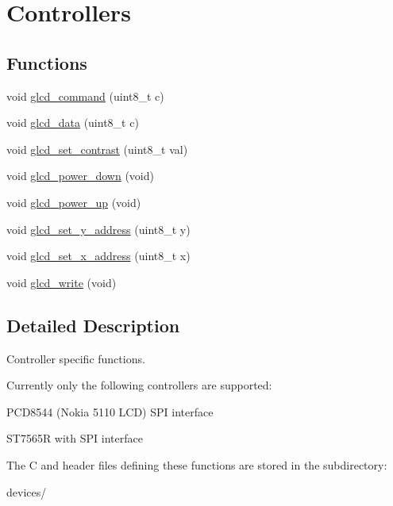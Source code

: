 \hypertarget{group___controllers}{}\section{Controllers}
\label{group___controllers}
\subsection*{Functions}
\begin{DoxyCompactItemize}
\item 
void \hyperlink{group___controllers_ga5b72b58ca45f76a55d3c3f38efc87eb8}{glcd\+\_\+command} (uint8\+\_\+t c)
\item 
void \hyperlink{group___controllers_gaba6b8ce5d4afaec0071f05f9c3510db6}{glcd\+\_\+data} (uint8\+\_\+t c)
\item 
void \hyperlink{group___controllers_gac206e5a35afe3ca28bb2ba3101484da8}{glcd\+\_\+set\+\_\+contrast} (uint8\+\_\+t val)
\item 
void \hyperlink{group___controllers_ga1a8994c3da4518c34e240971a37bfe9d}{glcd\+\_\+power\+\_\+down} (void)
\item 
void \hyperlink{group___controllers_ga496be0117727a0a2b86054932d85c209}{glcd\+\_\+power\+\_\+up} (void)
\item 
void \hyperlink{group___controllers_ga36434245ca7c131a775d7a6ba0cf587b}{glcd\+\_\+set\+\_\+y\+\_\+address} (uint8\+\_\+t y)
\item 
void \hyperlink{group___controllers_ga1fbdc5e57b13611a632dee191a56d772}{glcd\+\_\+set\+\_\+x\+\_\+address} (uint8\+\_\+t x)
\item 
void \hyperlink{group___controllers_ga0df6c0642fff31b764298958eda56efb}{glcd\+\_\+write} (void)
\end{DoxyCompactItemize}


\subsection{Detailed Description}
Controller specific functions.

Currently only the following controllers are supported\+:
\begin{DoxyItemize}
\item P\+C\+D8544 (Nokia 5110 L\+C\+D) S\+P\+I interface
\item S\+T7565\+R with S\+P\+I interface
\end{DoxyItemize}

The C and header files defining these functions are stored in the subdirectory\+: \begin{DoxyVerb}devices/\end{DoxyVerb}


